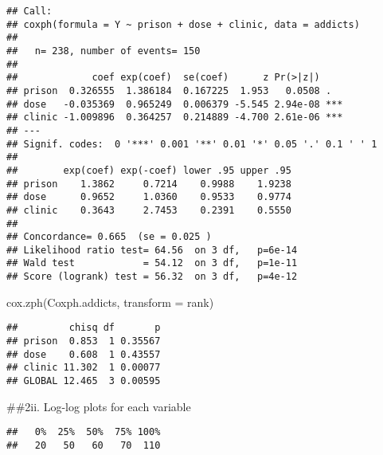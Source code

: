 \documentclass[
]{article}
\newenvironment{Shaded}{\begin{snugshade}}{\end{snugshade}}
\newcommand{\AttributeTok}[1]{\textcolor[rgb]{0.77,0.63,0.00}{#1}}
\newcommand{\CommentTok}[1]{\textcolor[rgb]{0.56,0.35,0.01}{\textit{#1}}}
\newcommand{\FunctionTok}[1]{\textcolor[rgb]{0.00,0.00,0.00}{#1}}
\newcommand{\NormalTok}[1]{#1}
\newcommand{\SpecialCharTok}[1]{\textcolor[rgb]{0.00,0.00,0.00}{#1}}
\begin{document}
\begin{verbatim}
## Call:
## coxph(formula = Y ~ prison + dose + clinic, data = addicts)
## 
##   n= 238, number of events= 150 
## 
##             coef exp(coef)  se(coef)      z Pr(>|z|)    
## prison  0.326555  1.386184  0.167225  1.953   0.0508 .  
## dose   -0.035369  0.965249  0.006379 -5.545 2.94e-08 ***
## clinic -1.009896  0.364257  0.214889 -4.700 2.61e-06 ***
## ---
## Signif. codes:  0 '***' 0.001 '**' 0.01 '*' 0.05 '.' 0.1 ' ' 1
## 
##        exp(coef) exp(-coef) lower .95 upper .95
## prison    1.3862     0.7214    0.9988    1.9238
## dose      0.9652     1.0360    0.9533    0.9774
## clinic    0.3643     2.7453    0.2391    0.5550
## 
## Concordance= 0.665  (se = 0.025 )
## Likelihood ratio test= 64.56  on 3 df,   p=6e-14
## Wald test            = 54.12  on 3 df,   p=1e-11
## Score (logrank) test = 56.32  on 3 df,   p=4e-12
\end{verbatim}

\begin{Shaded}
\begin{Highlighting}[]
\FunctionTok{cox.zph}\NormalTok{(Coxph.addicts, }\AttributeTok{transform =}\NormalTok{ rank)}
\end{Highlighting}
\end{Shaded}

\begin{verbatim}
##         chisq df       p
## prison  0.853  1 0.35567
## dose    0.608  1 0.43557
## clinic 11.302  1 0.00077
## GLOBAL 12.465  3 0.00595
\end{verbatim}

\#\#2ii. Log-log plots for each variable

\begin{Shaded}
\end{Shaded}

\begin{verbatim}
##   0%  25%  50%  75% 100% 
##   20   50   60   70  110
\end{verbatim}
\end{document}
